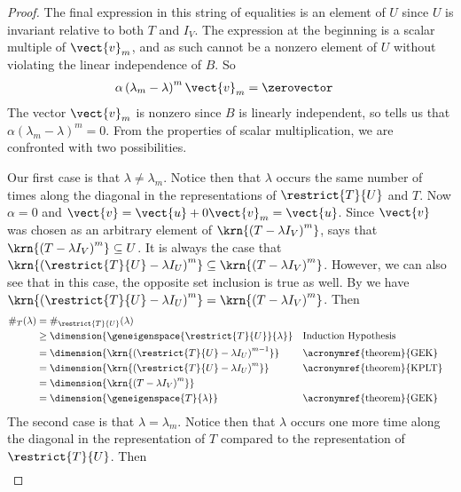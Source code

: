 \begin{proof}
%
The final expression in this string of equalities is an element of $U$ since $U$ is invariant relative to both $T$ and $I_V$.  The expression at the beginning is a scalar multiple of $\vect{v}_m$, and as such cannot be a nonzero element of $U$ without violating the linear independence of $B$.  So
%
\begin{align*}
\alpha\left(\lambda_m-\lambda\right)^m\vect{v}_m&=\zerovector
\end{align*}
%
The vector $\vect{v}_m$ is nonzero since $B$ is linearly independent, so  tells us that $\alpha\left(\lambda_m-\lambda\right)^m=0$.  From the properties of scalar multiplication, we are confronted with two possibilities.\par
%
Our first case is that $\lambda\neq\lambda_m$.  Notice then that $\lambda$ occurs the same number of times along the diagonal in the representations of $\restrict{T}{U}$ and $T$.  Now $\alpha=0$ and $\vect{v}=\vect{u}+0\vect{v}_m=\vect{u}$.   Since $\vect{v}$ was chosen as an arbitrary element of $\krn{\left(T-\lambda I_V\right)^m}$,  says that $\krn{\left(T-\lambda I_V\right)^m}\subseteq U$.  It is always the case that $\krn{\left(\restrict{T}{U}-\lambda I_U\right)^m}\subseteq\krn{\left(T-\lambda I_V\right)^m}$.  However, we can also see that in this case, the opposite set inclusion is true as well.  By  we have $\krn{\left(\restrict{T}{U}-\lambda I_U\right)^m}=\krn{\left(T-\lambda I_V\right)^m}$.  Then
%
\begin{align*}
\#_{T}(\lambda)
&=\#_{\restrict{T}{U}}(\lambda)\\
%
&\geq\dimension{\geneigenspace{\restrict{T}{U}}{\lambda}}
&&\text{Induction Hypothesis}\\
%
&=\dimension{\krn{\left(\restrict{T}{U}-\lambda I_U\right)^{m-1}}}
&&\text{\acronymref{theorem}{GEK}}\\
%
&=\dimension{\krn{\left(\restrict{T}{U}-\lambda I_U\right)^m}}
&&\text{\acronymref{theorem}{KPLT}}\\
%
&=\dimension{\krn{\left(T-\lambda I_V\right)^m}}\\
%
&=\dimension{\geneigenspace{T}{\lambda}}
&&\text{\acronymref{theorem}{GEK}}\\
%
\end{align*}
%
The second case is that $\lambda=\lambda_m$.  Notice then that $\lambda$ occurs one more time along the diagonal in the representation of $T$ compared to the representation of $\restrict{T}{U}$.
Then
%
\begin{align*}

\end{align*}
\end{proof}
